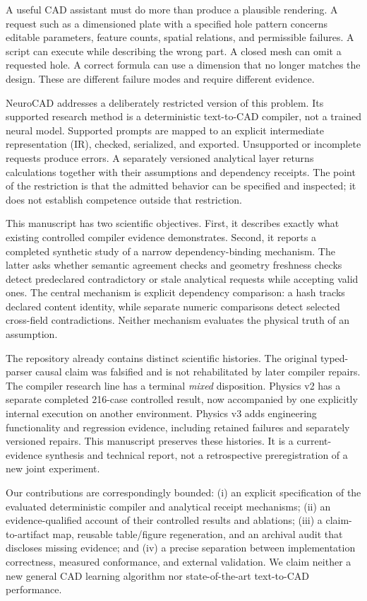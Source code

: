 \documentclass[10pt]{article}
\begin{document}
A useful CAD assistant must do more than produce a plausible rendering. A
request such as a dimensioned plate with a specified hole pattern concerns
editable parameters, feature counts, spatial relations, and permissible
failures. A script can execute while describing the wrong part. A closed mesh
can omit a requested hole. A correct formula can use a dimension that no longer
matches the design. These are different failure modes and require different
evidence.

NeuroCAD addresses a deliberately restricted version of this problem. Its
supported research method is a deterministic text-to-CAD compiler, not a
trained neural model. Supported prompts are mapped to an explicit intermediate
representation (IR), checked, serialized, and exported. Unsupported or
incomplete requests produce errors. A separately versioned analytical layer
returns calculations together with their assumptions and dependency receipts.
The point of the restriction is that the admitted behavior can be specified
and inspected; it does not establish competence outside that restriction.

This manuscript has two scientific objectives. First, it describes exactly
what existing controlled compiler evidence demonstrates. Second, it reports a
completed synthetic study of a narrow dependency-binding mechanism. The latter
asks whether semantic agreement checks and geometry freshness checks detect
predeclared contradictory or stale analytical requests while accepting valid
ones. The central mechanism is explicit dependency comparison: a hash tracks
declared content identity, while separate numeric comparisons detect selected
cross-field contradictions. Neither mechanism evaluates the physical truth of
an assumption.

The repository already contains distinct scientific histories. The original
typed-parser causal claim was falsified and is not rehabilitated by later
compiler repairs. The compiler research line has a terminal \emph{mixed}
disposition. Physics v2 has a separate completed 216-case controlled result,
now accompanied by one explicitly internal execution on another environment.
Physics v3 adds engineering functionality and regression evidence, including
retained failures and separately versioned repairs. This manuscript preserves
these histories. It is a current-evidence synthesis and technical report, not
a retrospective preregistration of a new joint experiment.

Our contributions are correspondingly bounded: (i) an explicit specification
of the evaluated deterministic compiler and analytical receipt mechanisms;
(ii) an evidence-qualified account of their controlled results and ablations;
(iii) a claim-to-artifact map, reusable table/figure regeneration, and an
archival audit that discloses missing evidence; and (iv) a precise separation
between implementation correctness, measured conformance, and external
validation. We claim neither a new general CAD learning algorithm nor
state-of-the-art text-to-CAD performance.
\end{document}
